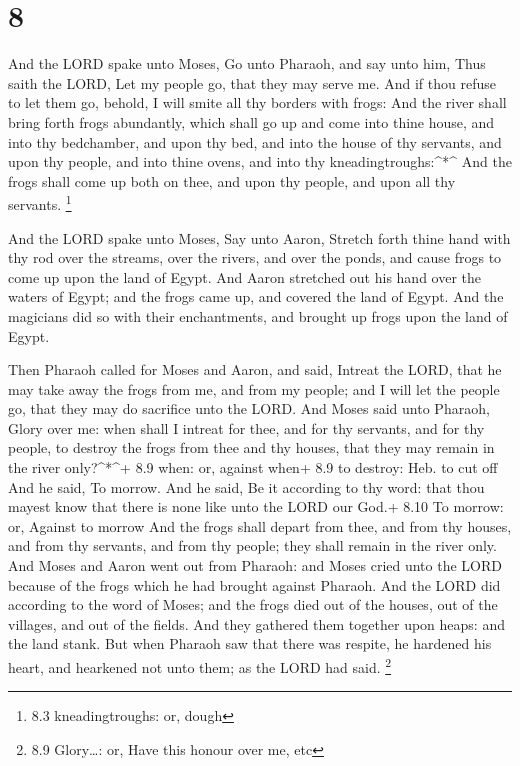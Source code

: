 \hypertarget{section-7}{%
\section{8}\label{section-7}}

 And the LORD spake unto Moses, Go unto Pharaoh, and say
unto him, Thus saith the LORD, Let my people go, that they may serve me.
 And if thou refuse to let them go, behold, I will smite all
thy borders with frogs:  And the river shall bring forth
frogs abundantly, which shall go up and come into thine house, and into
thy bedchamber, and upon thy bed, and into the house of thy servants,
and upon thy people, and into thine ovens, and into thy
kneadingtroughs:\^{}*\^{}  And the frogs shall come up both
on thee, and upon thy people, and upon all thy servants. \footnote{8.3
  kneadingtroughs: or, dough}

 And the LORD spake unto Moses, Say unto Aaron, Stretch
forth thine hand with thy rod over the streams, over the rivers, and
over the ponds, and cause frogs to come up upon the land of Egypt.
 And Aaron stretched out his hand over the waters of Egypt;
and the frogs came up, and covered the land of Egypt.  And
the magicians did so with their enchantments, and brought up frogs upon
the land of Egypt.

 Then Pharaoh called for Moses and Aaron, and said, Intreat
the LORD, that he may take away the frogs from me, and from my people;
and I will let the people go, that they may do sacrifice unto the LORD.
 And Moses said unto Pharaoh, Glory over me: when shall I
intreat for thee, and for thy servants, and for thy people, to destroy
the frogs from thee and thy houses, that they may remain in the river
only?\^{}*\^{}+ 8.9 when: or, against when+ 8.9 to destroy: Heb. to cut
off  And he said, To morrow. And he said, Be it according
to thy word: that thou mayest know that there is none like unto the LORD
our God.+ 8.10 To morrow: or, Against to morrow  And the
frogs shall depart from thee, and from thy houses, and from thy
servants, and from thy people; they shall remain in the river only.
 And Moses and Aaron went out from Pharaoh: and Moses cried
unto the LORD because of the frogs which he had brought against Pharaoh.
 And the LORD did according to the word of Moses; and the
frogs died out of the houses, out of the villages, and out of the
fields.  And they gathered them together upon heaps: and
the land stank.  But when Pharaoh saw that there was
respite, he hardened his heart, and hearkened not unto them; as the LORD
had said. \footnote{8.9 Glory\ldots: or, Have this honour over me, etc}

